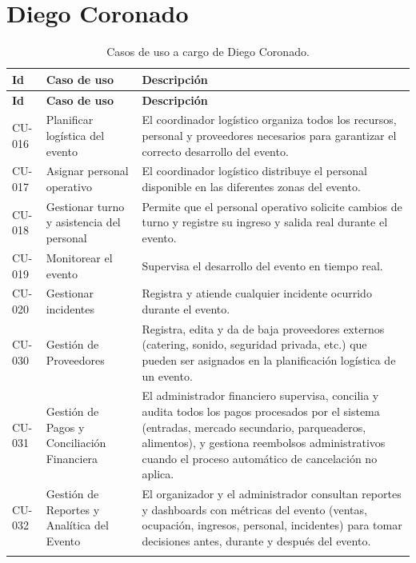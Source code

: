 \documentclass[11pt,a4paper]{article}
\begin{document}
\newpage

\section{Diego Coronado}

\begin{longtable}{P{1.6cm}P{4cm}P{9.4cm}}
\toprule
\textbf{Id} & \textbf{Caso de uso} & \textbf{Descripción}\\
\midrule
\endfirsthead
\toprule
\textbf{Id} & \textbf{Caso de uso} & \textbf{Descripción}\\
\midrule
\endhead

CU-016 & Planificar logística del evento &
El coordinador logístico organiza todos los recursos, personal y proveedores necesarios para
garantizar el correcto desarrollo del evento.\\[0.5em]

CU-017 & Asignar personal operativo &
El coordinador logístico distribuye el personal disponible en las diferentes zonas del
evento.\\[0.5em]

CU-018 & Gestionar turno y asistencia del personal &
Permite que el personal operativo solicite cambios de turno y registre su ingreso y salida real
durante el evento.\\[0.5em]

CU-019 & Monitorear el evento &
Supervisa el desarrollo del evento en tiempo real.\\[0.5em]

CU-020 & Gestionar incidentes &
Registra y atiende cualquier incidente ocurrido durante el evento.\\[0.5em]

CU-030 & Gestión de Proveedores &
Registra, edita y da de baja proveedores externos (catering, sonido, seguridad privada, etc.)
que pueden ser asignados en la planificación logística de un evento.\\[0.5em]

CU-031 & Gestión de Pagos y Conciliación Financiera &
El administrador financiero supervisa, concilia y audita todos los pagos procesados por el
sistema (entradas, mercado secundario, parqueaderos, alimentos), y gestiona reembolsos
administrativos cuando el proceso automático de cancelación no aplica.\\[0.5em]

CU-032 & Gestión de Reportes y Analítica del Evento &
El organizador y el administrador consultan reportes y dashboards con métricas del evento
(ventas, ocupación, ingresos, personal, incidentes) para tomar decisiones antes, durante y
después del evento.\\
\bottomrule
\caption{Casos de uso a cargo de Diego Coronado.}
\end{longtable}
\end{document}
